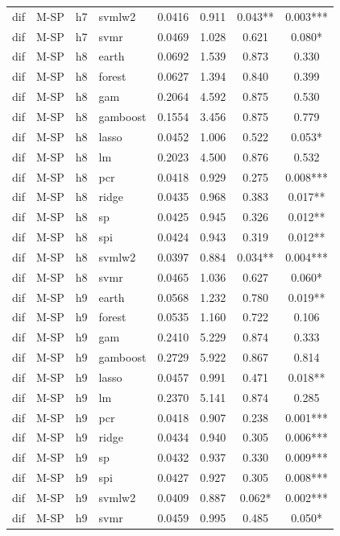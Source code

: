 \begin{ThreePartTable}
\begin{longtable}[t]{llclcccc}
dif & M-SP & h7 & svmlw2 & 0.0416 & 0.911 & 0.043** & 0.003***\\
dif & M-SP & h7 & svmr & 0.0469 & 1.028 & 0.621 & 0.080*\\
\addlinespace
dif & M-SP & h8 & earth & 0.0692 & 1.539 & 0.873 & 0.330\\
dif & M-SP & h8 & forest & 0.0627 & 1.394 & 0.840 & 0.399\\
dif & M-SP & h8 & gam & 0.2064 & 4.592 & 0.875 & 0.530\\
dif & M-SP & h8 & gamboost & 0.1554 & 3.456 & 0.875 & 0.779\\
dif & M-SP & h8 & lasso & 0.0452 & 1.006 & 0.522 & 0.053*\\
dif & M-SP & h8 & lm & 0.2023 & 4.500 & 0.876 & 0.532\\
dif & M-SP & h8 & pcr & 0.0418 & 0.929 & 0.275 & 0.008***\\
dif & M-SP & h8 & ridge & 0.0435 & 0.968 & 0.383 & 0.017**\\
dif & M-SP & h8 & sp & 0.0425 & 0.945 & 0.326 & 0.012**\\
dif & M-SP & h8 & spi & 0.0424 & 0.943 & 0.319 & 0.012**\\
dif & M-SP & h8 & svmlw2 & 0.0397 & 0.884 & 0.034** & 0.004***\\
dif & M-SP & h8 & svmr & 0.0465 & 1.036 & 0.627 & 0.060*\\
\addlinespace
dif & M-SP & h9 & earth & 0.0568 & 1.232 & 0.780 & 0.019**\\
dif & M-SP & h9 & forest & 0.0535 & 1.160 & 0.722 & 0.106\\
dif & M-SP & h9 & gam & 0.2410 & 5.229 & 0.874 & 0.333\\
dif & M-SP & h9 & gamboost & 0.2729 & 5.922 & 0.867 & 0.814\\
dif & M-SP & h9 & lasso & 0.0457 & 0.991 & 0.471 & 0.018**\\
dif & M-SP & h9 & lm & 0.2370 & 5.141 & 0.874 & 0.285\\
dif & M-SP & h9 & pcr & 0.0418 & 0.907 & 0.238 & 0.001***\\
dif & M-SP & h9 & ridge & 0.0434 & 0.940 & 0.305 & 0.006***\\
dif & M-SP & h9 & sp & 0.0432 & 0.937 & 0.330 & 0.009***\\
dif & M-SP & h9 & spi & 0.0427 & 0.927 & 0.305 & 0.008***\\
dif & M-SP & h9 & svmlw2 & 0.0409 & 0.887 & 0.062* & 0.002***\\
dif & M-SP & h9 & svmr & 0.0459 & 0.995 & 0.485 & 0.050*\\

\end{longtable}
\end{ThreePartTable}
